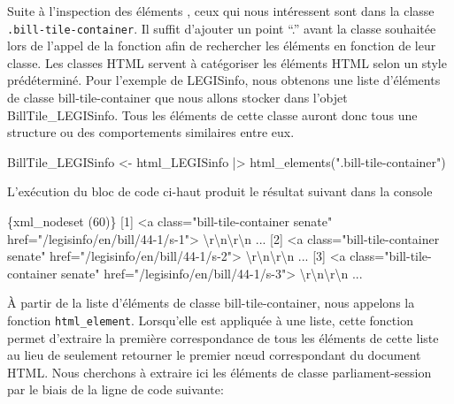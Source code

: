 \documentclass[
  letterpaper,
  DIV=11,
  numbers=noendperiod,
  oneside]{scrreprt}
\newenvironment{Shaded}{\begin{snugshade}}{\end{snugshade}}
\newcommand{\ErrorTok}[1]{\textcolor[rgb]{0.68,0.00,0.00}{#1}}
\newcommand{\ExtensionTok}[1]{\textcolor[rgb]{0.00,0.23,0.31}{#1}}
\newcommand{\KeywordTok}[1]{\textcolor[rgb]{0.00,0.23,0.31}{#1}}
\newcommand{\NormalTok}[1]{\textcolor[rgb]{0.00,0.23,0.31}{#1}}
\newcommand{\OperatorTok}[1]{\textcolor[rgb]{0.37,0.37,0.37}{#1}}
\newcommand{\StringTok}[1]{\textcolor[rgb]{0.13,0.47,0.30}{#1}}
\begin{document}
Suite à l'inspection des éléments , ceux qui nous intéressent sont dans
la classe \texttt{.bill-tile-container}. Il suffit d'ajouter un point
``.'' avant la classe souhaitée lors de l'appel de la fonction afin de
rechercher les éléments en fonction de leur classe. Les classes HTML
servent à catégoriser les éléments HTML selon un style prédéterminé.
Pour l'exemple de LEGISinfo, nous obtenons une liste d'éléments de
classe bill-tile-container que nous allons stocker dans l'objet
BillTile\_LEGISinfo. Tous les éléments de cette classe auront donc tous
une structure ou des comportements similaires entre eux.

\begin{Shaded}
\begin{Highlighting}[]
\ExtensionTok{BillTile\_LEGISinfo} \OperatorTok{\textless{}}\NormalTok{{-} html\_LEGISinfo }\KeywordTok{|}\OperatorTok{\textgreater{}}\NormalTok{ html\_elements}\KeywordTok{(}\StringTok{".bill{-}tile{-}container"}\KeywordTok{)}
\end{Highlighting}
\end{Shaded}

L'exécution du bloc de code ci-haut produit le résultat suivant dans la
console

\begin{Shaded}
\begin{Highlighting}[]
\ExtensionTok{\{xml\_nodeset} \ErrorTok{(}\ExtensionTok{60}\KeywordTok{)}\ErrorTok{\}}
 \ExtensionTok{[1]} \OperatorTok{\textless{}}\NormalTok{a class=}\StringTok{"bill{-}tile{-}container senate"}\NormalTok{ href=}\StringTok{"/legisinfo/en/bill/44{-}1/s{-}1"}\OperatorTok{\textgreater{}}
 \ExtensionTok{\textbackslash{}r\textbackslash{}n\textbackslash{}r\textbackslash{}n}\NormalTok{     ...}
 \ExtensionTok{[2]} \OperatorTok{\textless{}}\NormalTok{a class=}\StringTok{"bill{-}tile{-}container senate"}\NormalTok{ href=}\StringTok{"/legisinfo/en/bill/44{-}1/s{-}2"}\OperatorTok{\textgreater{}}
 \ExtensionTok{\textbackslash{}r\textbackslash{}n\textbackslash{}r\textbackslash{}n}\NormalTok{     ...}
 \ExtensionTok{[3]} \OperatorTok{\textless{}}\NormalTok{a class=}\StringTok{"bill{-}tile{-}container senate"}\NormalTok{ href=}\StringTok{"/legisinfo/en/bill/44{-}1/s{-}3"}\OperatorTok{\textgreater{}}
 \ExtensionTok{\textbackslash{}r\textbackslash{}n\textbackslash{}r\textbackslash{}n}\NormalTok{     ...}
\end{Highlighting}
\end{Shaded}

À partir de la liste d'éléments de classe bill-tile-container, nous
appelons la fonction \texttt{html\_element}. Lorsqu'elle est appliquée à
une liste, cette fonction permet d'extraire la première correspondance
de tous les éléments de cette liste au lieu de seulement retourner le
premier nœud correspondant du document HTML. Nous cherchons à extraire
ici les éléments de classe parliament-session par le biais de la ligne
de code suivante:
\end{document}
